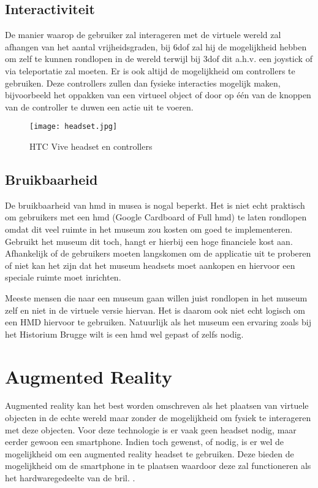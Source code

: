 \subsection{Interactiviteit}
De manier waarop de gebruiker zal interageren met de virtuele wereld zal afhangen van het aantal vrijheidsgraden, bij \acrshort{6dof} zal hij de mogelijkheid hebben om zelf te kunnen rondlopen in de wereld terwijl bij \acrshort{3dof} dit a.h.v. een joystick of via teleportatie zal moeten. Er is ook altijd de mogelijkheid om controllers te gebruiken. Deze controllers zullen dan fysieke interacties mogelijk maken, bijvoorbeeld het oppakken van een virtueel object of door op één van de knoppen van de controller te duwen een actie uit te voeren.

\begin{figure}
    \texttt{[image: headset.jpg]}
    \caption{HTC Vive headset en controllers}
    \label{fig:htcvive}
\end{figure}

\subsection{Bruikbaarheid}
De bruikbaarheid van \acrshort{hmd} in musea is nogal beperkt. Het is niet echt praktisch om gebruikers met een \acrshort{hmd} (Google Cardboard of Full \acrshort{hmd}) te laten rondlopen omdat dit veel ruimte in het museum zou kosten om goed te implementeren. Gebruikt het museum dit toch, hangt er hierbij een hoge financiele kost aan. Afhankelijk of de gebruikers moeten langskomen om de applicatie uit te proberen of niet kan het zijn dat het museum headsets moet aankopen en hiervoor een speciale ruimte moet inrichten.

Meeste mensen die naar een museum gaan willen juist rondlopen in het museum zelf en niet in de virtuele versie hiervan. Het is daarom ook niet echt logisch om een HMD hiervoor te gebruiken. Natuurlijk als het museum een ervaring zoals bij het Historium Brugge wilt is een \acrshort{hmd} wel gepast of zelfs nodig.

\section{Augmented Reality} \label{sec:augmentedreality}
Augmented reality kan het best worden omschreven als het plaatsen van virtuele objecten in de echte wereld maar zonder de mogelijkheid om fysiek te interageren met deze objecten. Voor deze technologie is er vaak geen headset nodig, maar eerder gewoon een smartphone. Indien toch gewenst, of nodig, is er wel de mogelijkheid om een augmented reality headset te gebruiken. Deze bieden de mogelijkheid om de smartphone in te plaatsen waardoor deze zal functioneren als het hardwaregedeelte van de bril. \autocite{Schops2014}.

